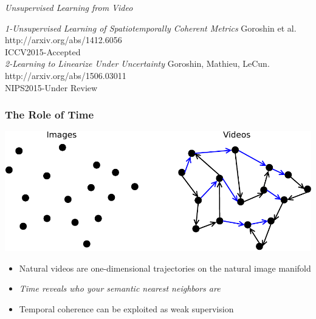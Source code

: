 \documentclass{beamer}
\begin{document}
\begin{frame}
\begin{center} 
\huge \color{blue} \emph{Unsupervised Learning from Video} \newline 
\end{center} 
\begin{center} 
\color{blue} \small{\emph{1-Unsupervised Learning of Spatiotemporally Coherent Metrics}\newline 
Goroshin et al. http://arxiv.org/abs/1412.6056 \\ICCV2015-Accepted \\ \vspace{0.2cm} 
\color{blue} \emph{2-Learning to Linearize Under Uncertainty}\newline 
Goroshin, Mathieu, LeCun. http://arxiv.org/abs/1506.03011} \\ NIPS2015-Under Review 
\end{center} 
\end{frame} 

\begin{frame} 
\frametitle{The Role of Time}
\begin{center} 
\includegraphics[scale=0.4]{./Figures/time.pdf}
\end{center} 
\begin{itemize} 
\item{Natural videos are one-dimensional trajectories on the natural image manifold}
\item{\emph{Time reveals who your semantic nearest neighbors are}}
\item{Temporal coherence can be exploited as weak supervision}
\end{itemize} 
\end{frame} 
\end{document}
